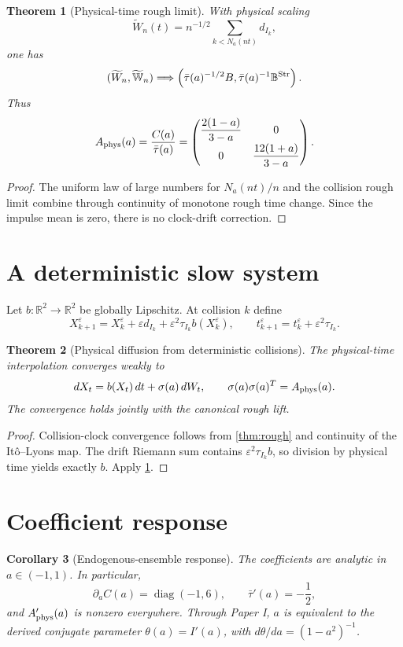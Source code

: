 \documentclass[11pt,reqno]{amsart}
\newtheorem{theorem}{Theorem}[section]
\newtheorem{corollary}[theorem]{Corollary}
\theoremstyle{remark}
\newcommand{\R}{\mathbb R}
\begin{document}
\begin{theorem}[Physical-time rough limit]\label{thm:physical}
With physical scaling
\[
 \widetilde W_n(t)=n^{-1/2}\sum_{k<N_a(nt)}d_{I_k},
\]
one has
\[
 (\widetilde W_n,\widetilde{\mathbb W}_n)
 \Longrightarrow
 \left(\bar\tau(a)^{-1/2}B,
       \bar\tau(a)^{-1}\mathbb B^{\rm Str}\right).
\]
Thus
\[
 A_{\rm phys}(a)=\frac{C(a)}{\bar\tau(a)}
 =\begin{pmatrix}
 \dfrac{2(1-a)}{3-a}&0\\[2mm]
 0&\dfrac{12(1+a)}{3-a}
 \end{pmatrix}.
\]
\end{theorem}
\begin{proof}
The uniform law of large numbers for $N_a(nt)/n$ and the collision rough limit
combine through continuity of monotone rough time change.  Since the impulse
mean is zero, there is no clock-drift correction.
\end{proof}

\section{A deterministic slow system}
Let $b:\R^2\to\R^2$ be globally Lipschitz.  At collision $k$ define
\[
 X_{k+1}^\varepsilon
 =X_k^\varepsilon+\varepsilon d_{I_k}
  +\varepsilon^2\tau_{I_k}b(X_k^\varepsilon),
\qquad
 t_{k+1}^\varepsilon=t_k^\varepsilon+
 \varepsilon^2\tau_{I_k}.
\]

\begin{theorem}[Physical diffusion from deterministic collisions]\label{thm:sde}
The physical-time interpolation converges weakly to
\[
 dX_t=b(X_t)\,dt+\sigma(a)\,dW_t,
 \qquad \sigma(a)\sigma(a)^T=A_{\rm phys}(a).
\]
The convergence holds jointly with the canonical rough lift.
\end{theorem}
\begin{proof}
Collision-clock convergence follows from \cref{thm:rough} and continuity of
the It\^o--Lyons map.  The drift Riemann sum contains
$\varepsilon^2\tau_{I_k}b$, so division by physical time yields exactly $b$.
Apply \cref{thm:physical}.
\end{proof}

\section{Coefficient response}
\begin{corollary}[Endogenous-ensemble response]\label{cor:response}
The coefficients are analytic in $a\in(-1,1)$.  In particular,
\[
 \partial_a C(a)=\operatorname{diag}(-1,6),
 \qquad \bar\tau'(a)=-\frac12,
\]
and $A_{\rm phys}'(a)$ is nonzero everywhere.
Through Paper I, $a$ is equivalent to the derived conjugate parameter
$\theta(a)=I'(a)$, with $d\theta/da=(1-a^2)^{-1}$.
\end{corollary}
\end{document}
